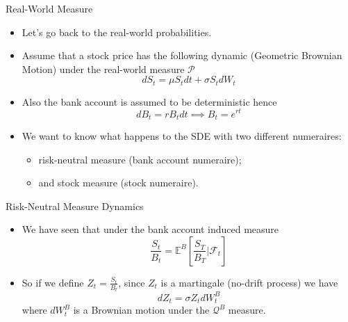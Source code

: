 \documentclass{beamer}
\begin{document}

\begin{frame}{Real-World Measure}
\begin{itemize}
	\item Let's go back to the real-world probabilities.
	\item Assume that a stock price has the following dynamic (Geometric Brownian Motion) under the real-world measure $\mathcal{P}$
	\begin{equation*}
	dS_t = \mu S_t dt + \sigma S_t dW_t
	\end{equation*}
	\item Also the bank account is assumed to be deterministic hence
	\begin{equation*}
	dB_t = rB_tdt\implies B_t = e^{rt}
	\end{equation*}
	\item We want to know what happens to the SDE with two different numeraires:
	\begin{itemize}
		\item risk-neutral measure (bank account numeraire);
		\item and stock measure (stock numeraire).
	\end{itemize}
\end{itemize}
\end{frame}

\begin{frame}{Risk-Neutral Measure Dynamics}
	\begin{itemize}
	\item We have seen that under the bank account induced measure
	\begin{equation*}
	\frac{S_t}{B_t} = \mathbb{E}^B\left[\frac{S_T}{B_T}\bigg|\mathcal{F}_t\right]
	\end{equation*}
	\item So if we define $Z_t=\frac{S_t}{B_t}$, since $Z_t$ is a martingale (no-drift process) we have 
	\begin{equation}
	dZ_t = \sigma Z_t dW_t^B
	\label{eq:z_martingale1}
	\end{equation}
	where $dW_t^B$ is a Brownian motion under the $\mathcal{Q}^B$ measure.
\end{itemize}
\end{frame}
\end{document}
